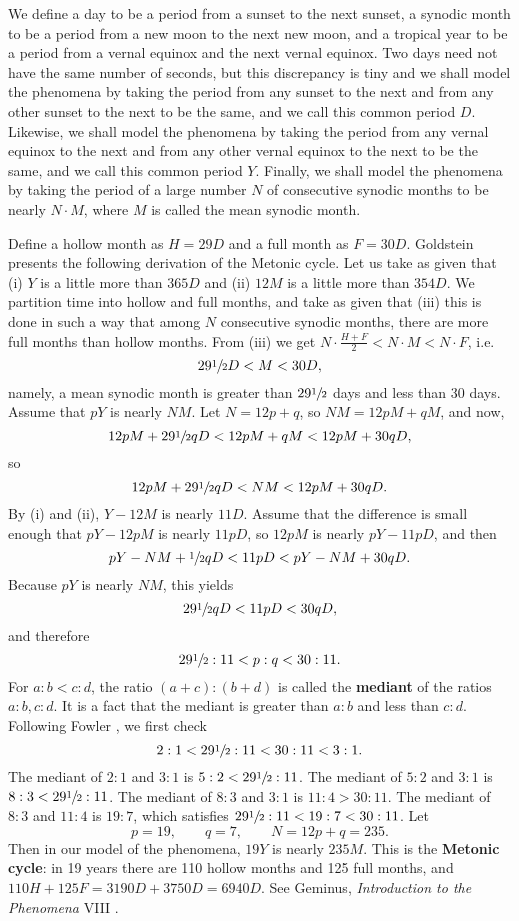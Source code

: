 \documentclass{article}
\begin{document}
We define
a day to be a period
from a sunset to the next sunset,
a  synodic month to be a period from a new moon to the next new moon, and
a tropical year to be a period from a vernal equinox and the next vernal equinox.
Two days need not have the same number of seconds, but this discrepancy is tiny and 
we shall model the phenomena by taking the period from any sunset to the next and from any other sunset to the next to be the same, and we
call this common period $D$. Likewise, 
we shall model the phenomena by taking the period from any vernal equinox to the next and from any other vernal equinox to the next
to be the same, and we call this common period $Y$. 
Finally, we shall model the phenomena by taking the period of a large number $N$ of consecutive synodic months to be nearly $N \cdot M$, where $M$ is called
the mean synodic month.


Define a hollow month as $H=29D$ and a full month  as $F=30D$. 
Goldstein \cite{goldstein} presents the following derivation of  the Metonic cycle.
Let us take as given that
(i) $Y$ is a little more than $365 D$ and  (ii) $12 M$ is a little more than $354 D$. We partition time into
hollow and full months, and take as given that (iii) this is done in such a way that among $N$ consecutive synodic months, there are more
full months than hollow months.
From (iii) we get $N \cdot \frac{H+F}{2} < N\cdot M < N \cdot F$, i.e.
\[
29 \sfrac{1}{2}  D< M < 30D,
\]
namely, a mean synodic month is greater than $29\sfrac{1}{2}$ days and less than 30 days. 
Assume that $pY$ is nearly $NM$.
Let $N=12 p + q$, so
$N  M = 12pM + qM$, and
now,
\[
12pM+29 \sfrac{1}{2} qD <12pM+ qM < 12pM+30qD,
\]
so 
\[
12pM+29 \sfrac{1}{2} qD  < NM < 12pM +30qD.
\]
By (i) and (ii), $Y-12M$ is nearly $11D$. Assume that the difference is small enough that
$pY-12pM$ is nearly $11pD$, so $12pM$ is nearly $pY-11pD$, and then 
\[
pY -NM+  \sfrac{1}{2} qD < 11pD <  pY -NM+ 30qD.
\]
Because $pY$ is nearly $NM$, this yields
\[
29 \sfrac{1}{2} qD < 11pD < 30qD,
\]
and therefore
\[
29 \sfrac{1}{2} : 11 < p:q < 30:11.
\]
For $a:b < c:d$, the ratio $(a+c):(b+d)$ is called the \textbf{mediant} of the ratios $a:b, c:d$. 
It is a fact that the mediant is greater than $a:b$ and less than $c:d$. 
Following Fowler \cite[pp.~42--43]{fowler},
we first check
\[
2:1< 29 \sfrac{1}{2} : 11  < 30:11 < 3:1.
\]
The mediant of $2:1$ and $3:1$ is $5:2<29 \sfrac{1}{2} : 11$. 
The mediant of $5:2$ and $3:1$ is $8:3<29 \sfrac{1}{2} : 11$. 
The mediant of $8:3$ and $3:1$ is $11:4>30:11$. 
The mediant of $8:3$ and $11:4$ is $19:7$, which satisfies $29 \sfrac{1}{2}:11 < 19:7 < 30:11$. 
Let
\[
p=19,\qquad q=7,\qquad N = 12p+q = 235.
\]
Then in our model of the phenomena, $19Y$ is nearly $235M$. 
This is the \textbf{Metonic cycle}: in 19 years there are 110 hollow months and 125 full months,
and $110H+125F = 3190D + 3750D = 6940D$.
See Geminus, {\em Introduction to the Phenomena} VIII \cite{geminus}.
\end{document}
